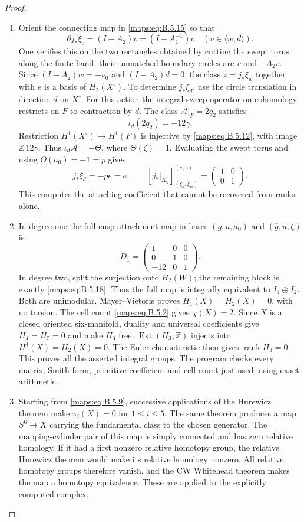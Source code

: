 \begin{proof}
\begin{enumerate}[label=\arabic*.,leftmargin=*]
\item Orient the connecting map in \eqref{maps:eq:B.5.15} so that
\[
 \partial j_*\xi_v=(I-A_2)v
                   =(I-A_1^{-1})v\quad(v\in\langle w,d\rangle).
\]
One verifies this on the two rectangles obtained
by cutting the swept torus along the finite band:
their unmatched boundary circles are $v$ and
$-A_2v$.  Since $(I-A_2)w=-\nu_0$ and
$(I-A_2)d=0$, the class $z=j_*\xi_w$ together with
$e$ is a basis of $H_2(X^\circ)$.
To determine $j_*\xi_d$, use the circle translation
in direction $d$ on $X^\circ$.  For this action the
integral sweep operator on cohomology restricts on
$F$ to contraction by $d$.  The class
$\mathcal A|_F=2q_2$ satisfies
\[
 \iota_d(2q_2)=-12\gamma.
\]
Restriction $H^1(X^\circ)\to H^1(F)$ is injective
by \eqref{maps:eq:B.5.12}, with image $\mathbb Z\,12\gamma$.
Thus $\iota_d\mathcal A=-\Theta$, where
$\Theta(\zeta)=1$.  Evaluating the swept torus and
using $\Theta(a_0)=-1=p$ gives
\[
 j_*\xi_d=-p e=e,
 \qquad
 [j_*|_{K_2}]_{(\xi_d,\xi_w)}^{(e,z)}
       =\begin{pmatrix}1&0\\0&1\end{pmatrix}.
 \tag{B.5.18}\label{maps:eq:B.5.18}
\]
This computes the attaching coefficient that cannot
be recovered from ranks alone.

\item In degree one the full cusp attachment map in bases
$(g,u,a_0)$ and $(\bar g,\bar u,\zeta)$ is
\[
 D_1=\begin{pmatrix}1&0&0\\0&1&0\\-12&0&1\end{pmatrix}.
\]
In degree two, split the surjection onto $H_2(W)$;
the remaining block is exactly \eqref{maps:eq:B.5.18}.  Thus the
full map is integrally equivalent to $I_4\oplus I_2$.
Both are unimodular.  Mayer--Vietoris proves
$H_1(X)=H_2(X)=0$, with no torsion.  The cell count
\eqref{maps:eq:B.5.2} gives $\chi(X)=2$.  Since $X$ is a closed
oriented six-manifold, duality and universal
coefficients give $H_4=H_5=0$ and make $H_3$ free:
$\operatorname{Ext}(H_3,\mathbb Z)$ injects into
$H^4(X)=H_2(X)=0$.  The Euler characteristic then
gives $\operatorname{rank}H_3=0$.  This proves all
the asserted integral groups.  The program checks
every matrix, Smith form, primitive coefficient
and cell count just used, using exact arithmetic.

\item Starting from \eqref{maps:eq:B.5.9}, successive applications of
the Hurewicz theorem make $\pi_i(X)=0$ for
$1\leq i\leq5$.  The same theorem produces a map
$S^6\to X$ carrying the fundamental class to the
chosen generator.  The mapping-cylinder pair of
this map is simply connected and has zero relative
homology.  If it had a first nonzero relative
homotopy group, the relative Hurewicz theorem
would make its relative homology nonzero.  All
relative homotopy groups therefore vanish, and
the CW Whitehead theorem makes the map a homotopy
equivalence.  These
are \cite[Theorems 4.32 and 4.5]{mapsHatcher02}
applied to the explicitly computed complex.


\end{enumerate}
\end{proof}
